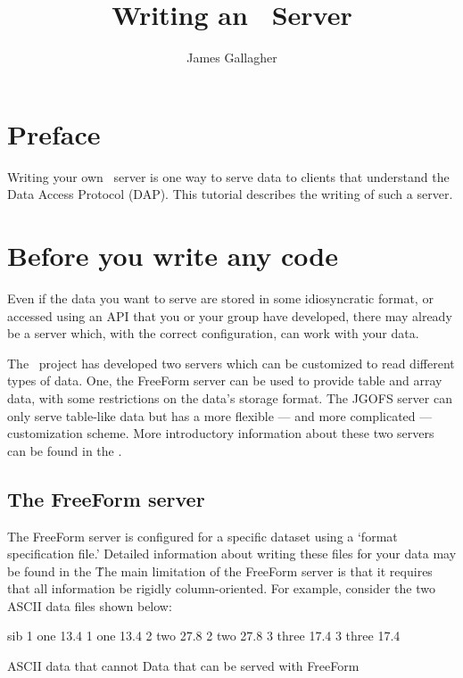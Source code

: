 \documentclass{dods-paper}
\title{Writing an \opendap\ Server}
\author{James Gallagher}
\begin{document}
\maketitle

\T\tableofcontents

\section{Preface}

Writing your own \opendap\ server is one way to serve data to clients
that understand the Data Access Protocol (DAP). This tutorial
describes the writing of such a server.


\section{Before you write any code}

Even if the data you want to serve are stored in some idiosyncratic
format, or accessed using an API that you or your group have
developed, there may already be a server which, with the correct
configuration, can work with your data.

The \opendap\ project has developed two servers which can be customized to
read different types of data.  One, the FreeForm server can be used to
provide table and array data, with some restrictions on the data's
storage format.  The JGOFS server can only serve table-like data but
has a more flexible --- and more complicated --- customization scheme.
More introductory information about these two servers can be found in
the .

  

\subsection{The FreeForm server}


The FreeForm server is configured for a specific dataset using a
`format specification file.' Detailed information about writing these
files for your data may be found in the \OPDffbook\.
The main limitation of the FreeForm server is that it requires that
all information be rigidly column-oriented. For example, consider the
two ASCII data files shown below:

\begin{vcode}{sib}
  1 one 13.4                            1 one   13.4
  2 two 27.8                            2 two   27.8
  3 three 17.4                          3 three 17.4

ASCII data that cannot                  Data that can
be served with FreeForm
\end{vcode}
\end{document}
